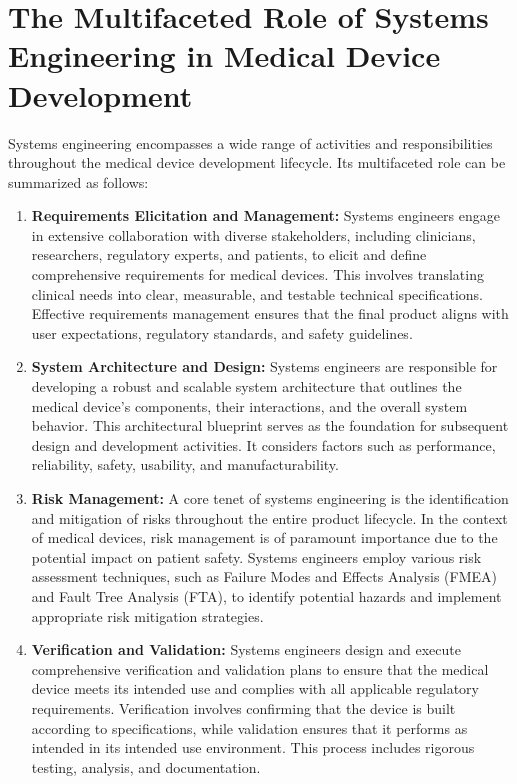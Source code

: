 \documentclass[conference]{IEEEtran}
\begin{document}
\section{The Multifaceted Role of Systems Engineering in Medical Device Development}

    Systems engineering encompasses a wide range of activities and 
    responsibilities throughout the medical device development 
    lifecycle. Its multifaceted role can be summarized as follows:

    \begin{enumerate}
        \item \textbf{Requirements Elicitation and Management:} Systems 
        engineers engage in extensive collaboration with diverse stakeholders, 
        including clinicians, researchers, regulatory experts, and patients, 
        to elicit and define comprehensive requirements for medical devices. 
        This involves translating clinical needs into clear, measurable, 
        and testable technical specifications. Effective requirements 
        management ensures that the final product aligns with user 
        expectations, regulatory standards, and safety guidelines.
        
        \item \textbf{System Architecture and Design:} Systems engineers are 
        responsible for developing a robust and scalable system architecture 
        that outlines the medical device's components, their interactions, and the 
        overall system behavior. This architectural blueprint serves as the 
        foundation for subsequent design and development activities. It 
        considers factors such as performance, reliability, safety, usability, 
        and manufacturability.

        \item \textbf{Risk Management:} A core tenet of systems engineering 
        is the identification and mitigation of risks throughout the entire 
        product lifecycle. In the context of medical devices, risk management 
        is of paramount importance due to the potential impact on patient 
        safety. Systems engineers employ various risk assessment techniques, 
        such as Failure Modes and Effects Analysis (FMEA) and Fault Tree 
        Analysis (FTA), to identify potential hazards and implement 
        appropriate risk mitigation strategies. %

        \item \textbf{Verification and Validation:} Systems engineers design 
        and execute comprehensive verification and validation plans to 
        ensure that the medical device meets its intended use and complies 
        with all applicable regulatory requirements. Verification involves 
        confirming that the device is built according to specifications, 
        while validation ensures that it performs as intended in its 
        intended use environment. This process includes rigorous testing, 
        analysis, and documentation.


\end{enumerate}
\end{document}
